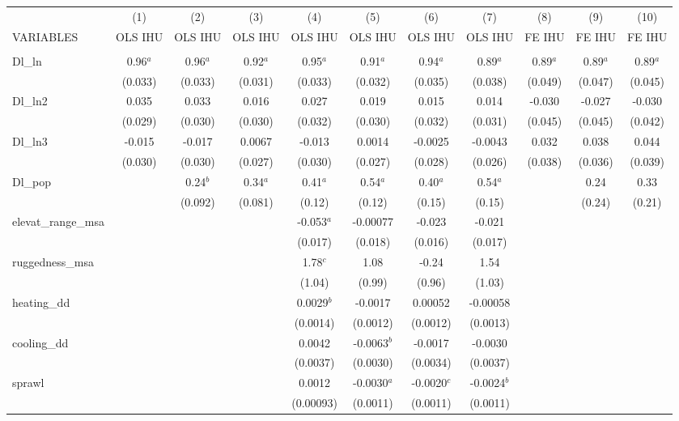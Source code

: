 \documentclass[]{article}
\begin{document}
\begin{tabular}{lcccccccccc} \hline
 & (1) & (2) & (3) & (4) & (5) & (6) & (7) & (8) & (9) & (10) \\
VARIABLES & OLS IHU & OLS IHU & OLS IHU & OLS IHU & OLS IHU & OLS IHU & OLS IHU & FE IHU & FE IHU & FE IHU \\ \hline
 &  &  &  &  &  &  &  &  &  &  \\
Dl\_ln & 0.96$^a$ & 0.96$^a$ & 0.92$^a$ & 0.95$^a$ & 0.91$^a$ & 0.94$^a$ & 0.89$^a$ & 0.89$^a$ & 0.89$^a$ & 0.89$^a$ \\
 & (0.033) & (0.033) & (0.031) & (0.033) & (0.032) & (0.035) & (0.038) & (0.049) & (0.047) & (0.045) \\
Dl\_ln2 & 0.035 & 0.033 & 0.016 & 0.027 & 0.019 & 0.015 & 0.014 & -0.030 & -0.027 & -0.030 \\
 & (0.029) & (0.030) & (0.030) & (0.032) & (0.030) & (0.032) & (0.031) & (0.045) & (0.045) & (0.042) \\
Dl\_ln3 & -0.015 & -0.017 & 0.0067 & -0.013 & 0.0014 & -0.0025 & -0.0043 & 0.032 & 0.038 & 0.044 \\
 & (0.030) & (0.030) & (0.027) & (0.030) & (0.027) & (0.028) & (0.026) & (0.038) & (0.036) & (0.039) \\
Dl\_pop &  & 0.24$^b$ & 0.34$^a$ & 0.41$^a$ & 0.54$^a$ & 0.40$^a$ & 0.54$^a$ &  & 0.24 & 0.33 \\
 &  & (0.092) & (0.081) & (0.12) & (0.12) & (0.15) & (0.15) &  & (0.24) & (0.21) \\
elevat\_range\_msa &  &  &  & -0.053$^a$ & -0.00077 & -0.023 & -0.021 &  &  &  \\
 &  &  &  & (0.017) & (0.018) & (0.016) & (0.017) &  &  &  \\
ruggedness\_msa &  &  &  & 1.78$^c$ & 1.08 & -0.24 & 1.54 &  &  &  \\
 &  &  &  & (1.04) & (0.99) & (0.96) & (1.03) &  &  &  \\
heating\_dd &  &  &  & 0.0029$^b$ & -0.0017 & 0.00052 & -0.00058 &  &  &  \\
 &  &  &  & (0.0014) & (0.0012) & (0.0012) & (0.0013) &  &  &  \\
cooling\_dd &  &  &  & 0.0042 & -0.0063$^b$ & -0.0017 & -0.0030 &  &  &  \\
 &  &  &  & (0.0037) & (0.0030) & (0.0034) & (0.0037) &  &  &  \\
sprawl &  &  &  & 0.0012 & -0.0030$^a$ & -0.0020$^c$ & -0.0024$^b$ &  &  &  \\
 &  &  &  & (0.00093) & (0.0011) & (0.0011) & (0.0011) &  &  &  \\

\end{tabular}
\end{document}
